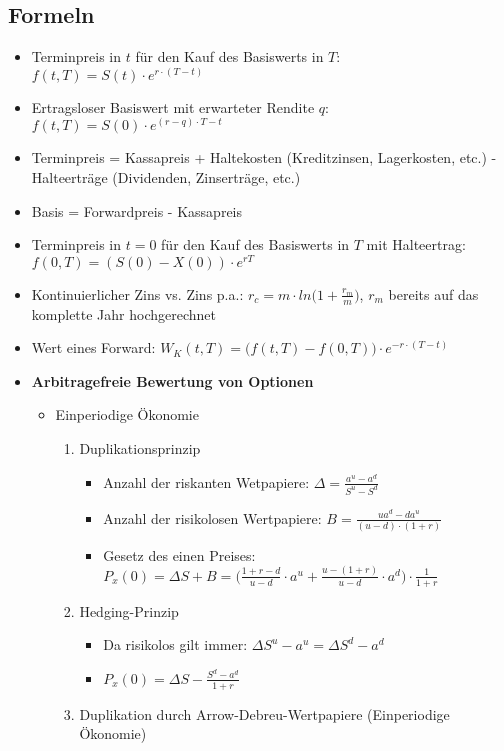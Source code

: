 \subsection{Formeln}
\begin{itemize}
	\item Terminpreis in \(t\) für den Kauf des Basiswerts in \(T\): \(f(t,T) = S(t)\cdot e^{r\cdot (T-t)}\)
	\item Ertragsloser Basiswert mit erwarteter Rendite \(q\): \(f(t,T) = S(0) \cdot e^{(r-q)\cdot T-t}\)
	\item Terminpreis = Kassapreis + Haltekosten (Kreditzinsen, Lagerkosten, etc.) - Halteerträge (Dividenden, Zinserträge, etc.)
	\item Basis = Forwardpreis - Kassapreis
	\item Terminpreis in \(t=0\) für den Kauf des Basiswerts in \(T\) mit Halteertrag: \(f(0,T) = (S(0)-X(0))\cdot e^{rT}\)
	\item Kontinuierlicher Zins vs. Zins p.a.: \(r_c = m \cdot ln\Big(1+\frac{r_m}{m}\Big)\), \(r_m\) bereits auf das komplette Jahr hochgerechnet
	\item Wert eines Forward: \(W_K(t,T) = \Big(f(t,T)-f(0,T)\Big) \cdot e^{-r\cdot (T-t)}\)
	\item \textbf{Arbitragefreie Bewertung von Optionen}
	\begin{itemize}
		\item Einperiodige Ökonomie
		\begin{enumerate}
			\item Duplikationsprinzip
			\begin{itemize}
				\item Anzahl der riskanten Wetpapiere: \(\Delta=\frac{a^u-a^d}{S^u-S^d}\)
				\item Anzahl der risikolosen Wertpapiere: \(B=\frac{ua^d-da^u}{(u-d)\cdot(1+r)}\)
				\item Gesetz des einen Preises: \(P_x(0)=\Delta S+B=\Big(\frac{1+r-d}{u-d}\cdot a^u + \frac{u-(1+r)}{u-d}\cdot a^d\Big)\cdot\frac{1}{1+r}\)
			\end{itemize}
			\item Hedging-Prinzip
			\begin{itemize}
				\item Da risikolos gilt immer: \(\Delta S^u - a^u = \Delta S^d - a^d\)
				\item \(P_x(0) = \Delta S - \frac{S^d - a^d}{1+r}\)
			\end{itemize}
			\item Duplikation durch Arrow-Debreu-Wertpapiere (Einperiodige Ökonomie)

\end{enumerate}
\end{itemize}
\end{itemize}
